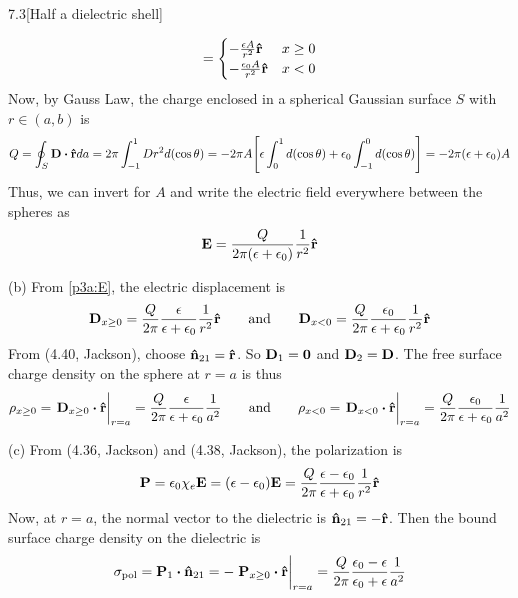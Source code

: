 \documentclass[12pt]{article}
\begin{document}
\begin{problem}{7.3}[Half a dielectric shell]
\begin{solution}
\begin{equation}
    =\begin{cases}
        -\frac{\epsilon A}{r^2}\vb{\hat{r}} & x\geq 0\\
        -\frac{\epsilon_0A}{r^2}\vb{\hat{r}} & x<0
    \end{cases}
\end{equation}
Now, by Gauss Law, the charge enclosed in a spherical Gaussian surface $S$ with
$r\in(a,b)$ is
\begin{equation}
    Q=\oint_S\vb{D}\vdot\rhat da
    =2\pi\int_{-1}^1 D r^2d(\cos\theta)
    =-2\pi A\qty[\epsilon\int_0^1d(\cos\theta)+\epsilon_0\int_{-1}^0d(\cos\theta)]
    =-2\pi(\epsilon+\epsilon_0)A
\end{equation}
Thus, we can invert for $A$ and write the electric field everywhere between the 
spheres as
\begin{equation}\label{p3a:E}
    \vb{E}=\frac{Q}{2\pi(\epsilon+\epsilon_0)}\frac1{r^2}\vb{\hat{r}} 
\end{equation}

(b) From \eqref{p3a:E}, the electric displacement is
\begin{equation}
    \vb{D}_{x\geq
    0}=\frac{Q}{2\pi}\frac{\epsilon}{\epsilon+\epsilon_0}\frac1{r^2}\vb{\hat{r}} 
    \qquad\text{and}\qquad
    \vb{D}_{x<
    0}=\frac{Q}{2\pi}\frac{\epsilon_0}{\epsilon+\epsilon_0}\frac1{r^2}\vb{\hat{r}} 
\end{equation}
From (4.40, Jackson), choose $\vb{\hat{n}}_{21}=\vb{\hat{r}}$. So $\vb{D}_1=\bm{0}$ and
$\vb{D}_2=\vb{D}$. The free surface charge density on the sphere at $r=a$ is
thus
\begin{equation}
    \rho_{x\geq
    0}=\eval{\vb{D}_{x\geq
0}\vdot\rhat}_{r=a}=\frac{Q}{2\pi}\frac{\epsilon}{\epsilon+\epsilon_0}\frac1{a^2} 
    \qquad\text{and}\qquad
    \rho_{x<
    0}=\eval{\vb{D}_{x<0}\vdot\rhat}_{r=a}=\frac{Q}{2\pi}\frac{\epsilon_0}{\epsilon+\epsilon_0}\frac1{a^2} 
\end{equation}

(c) From (4.36, Jackson) and (4.38, Jackson), the polarization is
\begin{equation}
    \vb{P}=\epsilon_0\chi_e\vb{E}=(\epsilon-\epsilon_0)\vb{E}
    =\frac{Q}{2\pi}\frac{\epsilon-\epsilon_0}{\epsilon+\epsilon_0}\frac1{r^2}\vb{\hat{r}}
\end{equation}
Now, at $r=a$, the normal vector to the dielectric is $\vb{\hat{n}}_{21}=-\vb{\hat{r}}$. Then 
the bound surface charge density on the dielectric is
\begin{equation}
    \sigma_{\text{pol}}=\vb{P}_1\vdot\nhat_{21}=-\eval{\vb{P}_{x\geq
    0}\vdot\rhat}_{r=a}
    =\frac{Q}{2\pi}\frac{\epsilon_0-\epsilon}{\epsilon_0+\epsilon}\frac1{a^2}
\end{equation}
\end{solution}
\end{problem}
\end{document}
